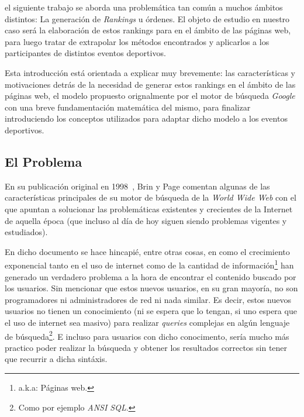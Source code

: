 \par {} el siguiente trabajo se aborda una problem\'atica tan
com\'un a muchos \'ambitos distintos: La generaci\'on de \textit{Rankings} u
\'ordenes. El objeto de estudio en nuestro caso ser\'a la elaboraci\'on de estos
rankings para en el \'ambito de las p\'aginas web, para luego tratar de
extrapolar los m\'etodos encontrados y aplicarlos a los participantes de
distintos eventos deportivos.

\par Esta introducci\'on est\'a orientada a explicar muy brevemente: las
caracter\'isticas y motivaciones detr\'as de la necesidad de generar estos
rankings en el \'ambito de las p\'aginas web, el modelo propuesto orignalmente
por el motor de b\'usqueda \emph{Google} con una breve fundamentaci\'on
matem\'atica del mismo, para finalizar introduciendo los conceptos utilizados
para adaptar dicho modelo a los eventos deportivos.

\subsection{El Problema}
\par En su publicaci\'on original en 1998~\cite{Brin1998}, Brin y Page comentan
algunas de las caracter\'isticas principales de su motor de b\'usqueda de la
\emph{World Wide Web} con el que apuntan a solucionar las problem\'aticas
existentes y crecientes de la Internet de aquella \'epoca (que incluso al d\'ia
de hoy siguen siendo problemas vigentes y estudiados).

\par En dicho documento se hace hincapi\'e, entre otras cosas, en como el
crecimiento exponencial tanto en el uso de internet como de la cantidad de
informaci\'on\footnote{a.k.a: P\'aginas web.} han generado un verdadero problema
a la hora de encontrar el contenido buscado por los usuarios. Sin mencionar que
estos nuevos usuarios, en su gran mayor\'ia, no son programadores ni
administradores de red ni nada similar. Es decir, estos nuevos usuarios no
tienen un conocimiento (ni se espera que lo tengan, si uno espera que el uso de
internet sea masivo) para realizar \emph{queries} complejas en alg\'un lenguaje
de b\'usqueda\footnote{Como por ejemplo \emph{ANSI SQL}.}. E incluso para
usuarios con dicho conocimento, ser\'ia mucho m\'as practico poder realizar la
b\'usqueda y obtener los resultados correctos sin tener que recurrir a dicha
sint\'axis.

